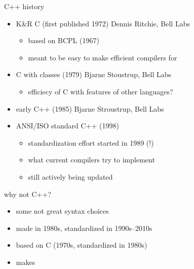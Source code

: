 \begin{frame}[fragile,label=cppHist]{C++ history}
\begin{itemize}
\item K\&R C (first published 1972) {\small Dennis Ritchie, Bell Labs}
    \begin{itemize}
    \item based on BCPL (1967)
    \item meant to be easy to make efficient compilers for
    \end{itemize}
\item C with classes (1979) {\small Bjarne Stoustrup, Bell Labs}
    \begin{itemize}
    \item efficiecy of C with features of other languages?
    \end{itemize}
\item early C++ (1985) {\small Bjarne Stroustrup, Bell Labs}
\item ANSI/ISO standard C++ (1998)
    \begin{itemize}
    \item standardization effort started in 1989 (!)
    \item what current compilers try to implement
    \item still actively being updated
    \end{itemize}
\end{itemize}
\end{frame}

\begin{frame}{why not C++?}
    \begin{itemize}
    \item some not great syntax choices
    \item made in 1980s, standardized in 1990s--2010s
    \item based on C (1970s, standardized in 1980s)
    \item makes 
    \end{itemize}
\end{frame}
